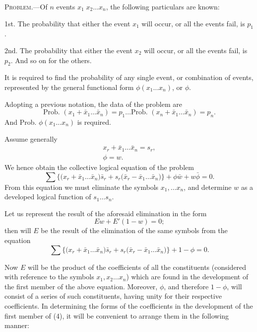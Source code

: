 \documentclass[oneside]{book}
\begin{document}
\textsc{Problem.}---Of $n$ events $x_1\; x_2 \dotsc x_n$, the following particulars
are known:

1st. The probability that either the event $x_1$ will occur, or
all the events fail, is $p_1$.

2nd. The probability that either the event $x_2$ will occur, or
all the events fail, is $p_2$. And so on for the others.

It is required to find the probability of any single event, or
combination of events, represented by the general functional form
$\phi(x_1 \dotsc x_n)$, or $\phi$.

Adopting a previous notation, the data of the problem are
\[
  \text{Prob. }(x_1 + \bar{x}_1 \dotsc \bar{x}_n) = p_1 \dotsc
  \text{Prob. }(x_n + \bar{x}_1 \dotsc \bar{x}_n) = p_n.
\]
And Prob. $\phi(x_1 \dotsc x_n)$ is required.

Assume generally
\begin{gather*}
  x_r + \bar{x}_1 \dotsc \bar{x}_n = s_r,    \tag{1}   \\
  \phi = w.                            \tag{2}
\end{gather*}
We hence obtain the collective logical equation of the problem
\[
  \sum \bigl\{\bigl( x_r + \bar{x}_1 \dotsc \bar{x}_n \bigr)\bar{s}_r
    + s_r \bigl( \bar{x}_r - \bar{x}_1 \dotsc \bar{x}_n \bigr)\bigr\}
  + \phi\bar{w} + w\bar{\phi} = 0.  \tag{3}
\]
From this equation we must eliminate the symbols $x_1, \dotsc x_n$, and
determine $w$ as a developed logical function of $s_1 \dotsc s_n$.

Let us represent the result of the aforesaid elimination in the
form
\[
  Ew + E'(1-w) = 0;
\]
then will $E$ be the result of the elimination of the same symbols
from the equation
\[
  \sum \bigl\{\bigl( x_r + \bar{x}_1 \dotsc \bar{x}_n \bigr)\bar{s}_r
    + s_r \bigl( \bar{x}_r - \bar{x}_1 \dotsc \bar{x}_n \bigr)\bigr\}
  + 1 - \phi = 0.  \tag{4}
\]

Now $E$ will be the product of the coefficients of all the constituents
(considered with reference to the symbols $x_1, x_2 \dotsc x_n$)
which are found in the development of the first member of the
above equation. Moreover, $\phi$, and therefore $1 - \phi$, will consist
of a series of such constituents, having unity for their respective
coefficients. In determining the forms of the coefficients in the
development of the first member of (4), it will be convenient to
arrange them in the following manner:
\end{document}
